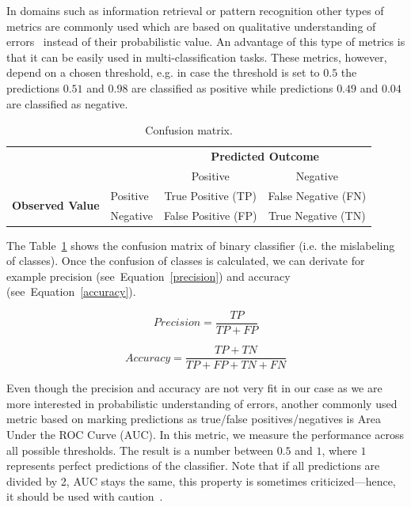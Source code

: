 In domains such as information retrieval or pattern recognition other types of metrics are commonly used which are based on qualitative understanding of errors~\cite{Pelanek2015a} instead of their probabilistic value. An advantage of this type of metrics is that it can be easily used in multi-classification tasks. These metrics, however, depend on a chosen threshold, e.g. in case the threshold is set to $0.5$ the predictions $0.51$ and $0.98$ are classified as positive while predictions $0.49$ and $0.04$ are classified as negative.

\begin{table}[htbp]
  \centering
  \caption{Confusion matrix.}
  \begin{tabular}{ l l c c }
   \toprule[\heavyrulewidth]
   & & \multicolumn{2}{c}{\textbf{Predicted Outcome}} \\
   & & Positive & Negative \\
   \midrule[\heavyrulewidth]
   \multirow{2}{5em}{\textbf{Observed Value}}
   & Positive & True Positive (TP) & False Negative (FN) \\
   & Negative & False Positive (FP) & True Negative (TN) \\
   \bottomrule[\heavyrulewidth]
  \end{tabular}
  \label{table:confusion-matrix}
\end{table}

The Table~\ref{table:confusion-matrix} shows the confusion matrix of binary classifier (i.e. the mislabeling of classes). Once the confusion of classes is calculated, we can derivate for example precision (see~Equation~\ref{precision}) and accuracy (see~Equation~\ref{accuracy}).

\begin{equation} \label{precision}
  \mathit{Precision} = \frac{TP}{TP + FP}
\end{equation}

\begin{equation} \label{accuracy}
  \mathit{Accuracy} = \frac{TP + TN}{TP + FP + TN + FN}
\end{equation}

Even though the precision and accuracy are not very fit in our case as we are more interested in probabilistic understanding of errors, another commonly used metric based on marking predictions as true/false positives/negatives is Area Under the ROC Curve (AUC). In this metric, we measure the performance across all possible thresholds. The result is a number between $0.5$ and $1$, where $1$ represents perfect predictions of the classifier. Note that if all predictions are divided by 2, AUC stays the same, this property is sometimes criticized---hence, it should be used with caution~\cite{Pelanek2015a}.


